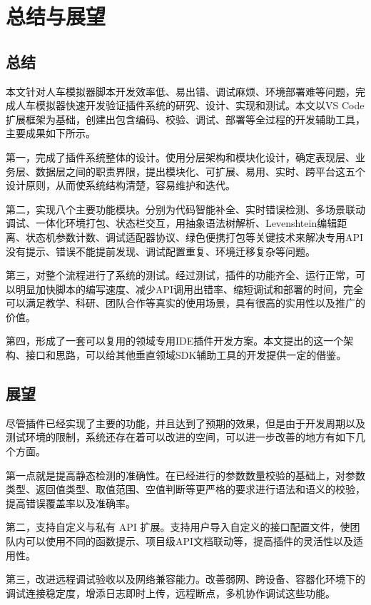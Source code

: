 
\chapter{总结与展望}

\section{总结}

本文针对人车模拟器脚本开发效率低、易出错、调试麻烦、环境部署难等问题，完成人车模拟器快速开发验证插件系统的研究、设计、实现和测试。本文以VS
Code扩展框架为基础，创建出包含编码、校验、调试、部署等全过程的开发辅助工具，主要成果如下所示。

第一，完成了插件系统整体的设计。使用分层架构和模块化设计，确定表现层、业务层、数据层之间的职责界限，提出模块化、可扩展、易用、实时、跨平台这五个设计原则，从而使系统结构清楚，容易维护和迭代。

第二，实现八个主要功能模块。分别为代码智能补全、实时错误检测、多场景联动调试、一体化环境打包、状态栏交互，用抽象语法树解析、Levenshtein编辑距离、状态机参数计数、调试适配器协议、绿色便携打包等关键技术来解决专用API没有提示、错误不能提前发现、调试配置重复、环境迁移复杂等问题。

第三，对整个流程进行了系统的测试。经过测试，插件的功能齐全、运行正常，可以明显加快脚本的编写速度、减少API调用出错率、缩短调试和部署的时间，完全可以满足教学、科研、团队合作等真实的使用场景，具有很高的实用性以及推广的价值。

第四，形成了一套可以复用的领域专用IDE插件开发方案。本文提出的这一个架构、接口和思路，可以给其他垂直领域SDK辅助工具的开发提供一定的借鉴。

\section{展望}

尽管插件已经实现了主要的功能，并且达到了预期的效果，但是由于开发周期以及测试环境的限制，系统还存在着可以改进的空间，可以进一步改善的地方有如下几个方面。

第一点就是提高静态检测的准确性。在已经进行的参数数量校验的基础上，对参数类型、返回值类型、取值范围、空值判断等更严格的要求进行语法和语义的校验，提高错误覆盖率以及准确率。

第二，支持自定义与私有 API
扩展。支持用户导入自定义的接口配置文件，使团队内可以使用不同的函数提示、项目级API文档联动等，提高插件的灵活性以及适用性。

第三，改进远程调试验收以及网络兼容能力。改善弱网、跨设备、容器化环境下的调试连接稳定度，增添日志即时上传，远程断点，多机协作调试这些功能。


